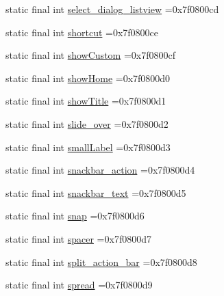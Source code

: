\begin{DoxyCompactItemize}
\item 
static final int \mbox{\hyperlink{classcom_1_1example_1_1trainawearapplication_1_1_r_1_1id_acc16e7da157086729da95d162698fe1c}{select\+\_\+dialog\+\_\+listview}} =0x7f0800cd
\item 
static final int \mbox{\hyperlink{classcom_1_1example_1_1trainawearapplication_1_1_r_1_1id_aa9310940a7088109dd5b7bad55815dda}{shortcut}} =0x7f0800ce
\item 
static final int \mbox{\hyperlink{classcom_1_1example_1_1trainawearapplication_1_1_r_1_1id_ab0990b6a542071fc8284bd1ff22885f0}{show\+Custom}} =0x7f0800cf
\item 
static final int \mbox{\hyperlink{classcom_1_1example_1_1trainawearapplication_1_1_r_1_1id_aa471359b437e10d1e98bde2bdd69e2b5}{show\+Home}} =0x7f0800d0
\item 
static final int \mbox{\hyperlink{classcom_1_1example_1_1trainawearapplication_1_1_r_1_1id_a7ae5b7f729df2b92e1516ae71efb3866}{show\+Title}} =0x7f0800d1
\item 
static final int \mbox{\hyperlink{classcom_1_1example_1_1trainawearapplication_1_1_r_1_1id_a3c54920b89e1af11f869bcade919ddc2}{slide\+\_\+over}} =0x7f0800d2
\item 
static final int \mbox{\hyperlink{classcom_1_1example_1_1trainawearapplication_1_1_r_1_1id_a15b45153b81084a1c2c83d41d5182680}{small\+Label}} =0x7f0800d3
\item 
static final int \mbox{\hyperlink{classcom_1_1example_1_1trainawearapplication_1_1_r_1_1id_a67b5358e5178a3789d4d299c0e2d903c}{snackbar\+\_\+action}} =0x7f0800d4
\item 
static final int \mbox{\hyperlink{classcom_1_1example_1_1trainawearapplication_1_1_r_1_1id_abe60aa195d20c413cf934e44bc454e2d}{snackbar\+\_\+text}} =0x7f0800d5
\item 
static final int \mbox{\hyperlink{classcom_1_1example_1_1trainawearapplication_1_1_r_1_1id_acffbe31448eae1b4259a67bb923386ca}{snap}} =0x7f0800d6
\item 
static final int \mbox{\hyperlink{classcom_1_1example_1_1trainawearapplication_1_1_r_1_1id_a8b90fbadaae34eec7b78baa972330665}{spacer}} =0x7f0800d7
\item 
static final int \mbox{\hyperlink{classcom_1_1example_1_1trainawearapplication_1_1_r_1_1id_a3374cddaa496d32711a6e9453a685de6}{split\+\_\+action\+\_\+bar}} =0x7f0800d8
\item 
static final int \mbox{\hyperlink{classcom_1_1example_1_1trainawearapplication_1_1_r_1_1id_aa690ce59a8f8129c0e88aba3c9b7e283}{spread}} =0x7f0800d9

\end{DoxyCompactItemize}
